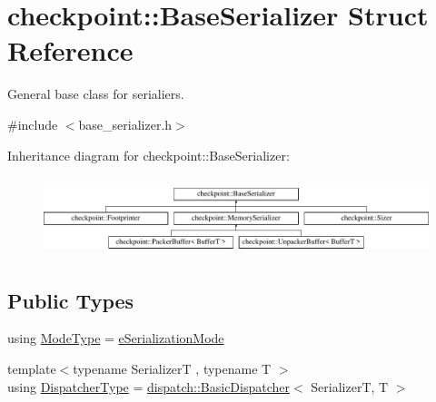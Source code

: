 \hypertarget{structcheckpoint_1_1_base_serializer}{}\section{checkpoint\+:\+:Base\+Serializer Struct Reference}
\label{structcheckpoint_1_1_base_serializer}


General base class for serialiers.  




{\ttfamily \#include $<$base\+\_\+serializer.\+h$>$}

Inheritance diagram for checkpoint\+:\+:Base\+Serializer\+:\begin{figure}[H]
\begin{center}
\leavevmode
\includegraphics[height=2.314050cm]{structcheckpoint_1_1_base_serializer}
\end{center}
\end{figure}
\subsection*{Public Types}
\begin{DoxyCompactItemize}
\item 
using \hyperlink{structcheckpoint_1_1_base_serializer_aaa856a02f204d9c3892810b87671b3e9}{Mode\+Type} = \hyperlink{namespacecheckpoint_ae2509499ccd8b1dc48fb535bf8aa3059}{e\+Serialization\+Mode}
\item 
{\footnotesize template$<$typename SerializerT , typename T $>$ }\\using \hyperlink{structcheckpoint_1_1_base_serializer_a6e98a837a89de1750749e4ef8742489c}{Dispatcher\+Type} = \hyperlink{structcheckpoint_1_1dispatch_1_1_basic_dispatcher}{dispatch\+::\+Basic\+Dispatcher}$<$ SerializerT, T $>$
\end{DoxyCompactItemize}

